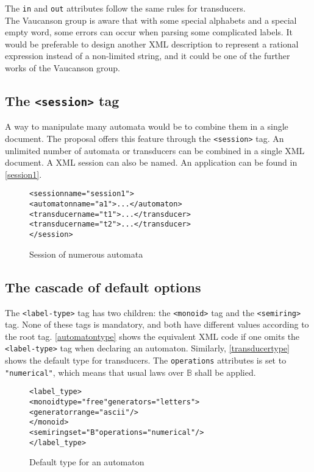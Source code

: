 \documentclass[a4paper]{article}
\newcommand{\Vauc}{{\sc Vaucanson}\xspace}
\def\typetag{\texttt{<label-type>}}
\def\sessiontag{\texttt{<session>}}
\def\monoidtag{\texttt{<monoid>}}
\def\semiringtag{\texttt{<semiring>}}
\begin{document}
The \verb|in| and \verb|out| attributes follow the same rules for transducers.\\
The \Vauc group is aware that with some special alphabets and a special empty
word, some errors can occur when parsing some complicated labels.
It would be preferable to design another XML description to represent a rational
expression instead of a non-limited string, and it could be one of the further
works of the \Vauc{} group.

\subsection{The \sessiontag{} tag}

A way to manipulate many automata would be to combine them in
a single document. The proposal offers this feature through the
\sessiontag{} tag. An unlimited number of automata or transducers
can be combined in a single XML document. A XML session can also be named.
An application can be found in \autoref{session1}.

{\small

\begin{figure}[h]
  \begin{center}
\begin{alltt}
<session name="session1">
  <automaton name="a1">...</automaton>
  <transducer name="t1">...</transducer>
  <transducer name="t2">...</transducer>
</session>
\end{alltt}

\caption{Session of numerous automata}
\label{session1}
  \end{center}
\end{figure}
}

\subsection{The cascade of default options}

The \typetag{} tag has two children: the \monoidtag{} tag and
the \semiringtag{} tag. None of these tags is mandatory, and both have
different values according to the root tag. \autoref{automatontype}
shows the equivalent XML code if one omits the
\typetag{} tag when declaring an automaton. Similarly,
\autoref{transducertype} shows the default type for transducers.
The \texttt{operations} attributes is set to \verb|"numerical"|,
which means that usual laws over $\mathbb{B}$ shall be applied.

\begin{figure}[h]
  \begin{center}
\begin{alltt}
<label_type>
  <monoid type="free" generators="letters">
     <generator range="ascii"/>
  </monoid>
  <semiring set="B" operations="numerical"/>
</label_type>
\end{alltt}

\caption{Default type for an automaton}
\label{automatontype}
  \end{center}
\end{figure}
\end{document}
